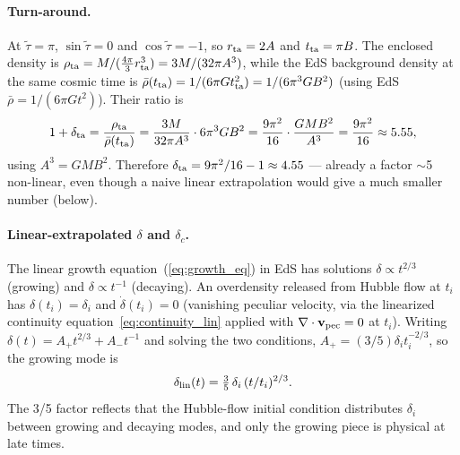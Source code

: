 \documentclass[12pt]{article}
\newcommand{\bv}{\mathbf{v}}
\begin{document}
\paragraph{Turn-around.}  At $\tilde\tau=\pi$, $\sin\tilde\tau=0$ and
$\cos\tilde\tau=-1$, so $r_{\rm ta}=2A$ and $t_{\rm ta}=\pi B$.
The enclosed density is
$\rho_{\rm ta} = M/(\tfrac{4\pi}{3}r_{\rm ta}^3) = 3M/(32\pi A^3)$,
while the EdS background density at the same cosmic time is
$\bar\rho(t_{\rm ta})=1/(6\pi G t_{\rm ta}^2)=1/(6\pi^3 G B^2)$
(using EdS $\bar\rho=1/(6\pi G t^2)$).  Their ratio is
%
\begin{equation}
  1+\delta_{\rm ta}
  = \frac{\rho_{\rm ta}}{\bar\rho(t_{\rm ta})}
  = \frac{3M}{32\pi A^3}\cdot 6\pi^3 G B^2
  = \frac{9\pi^2}{16}\cdot\frac{GMB^2}{A^3}
  = \frac{9\pi^2}{16} \approx 5.55,
\end{equation}
%
using $A^3 = GMB^2$.  Therefore $\delta_{\rm ta} = 9\pi^2/16 - 1
\approx 4.55$ --- already a factor $\sim$5 non-linear, even though a
naive linear extrapolation would give a much smaller number (below).

\paragraph{Linear-extrapolated $\delta$ and $\delta_c$.}  The linear
growth equation~(\ref{eq:growth_eq}) in EdS has solutions
$\delta \propto t^{2/3}$ (growing) and $\delta \propto t^{-1}$
(decaying).  An overdensity released from Hubble flow at $t_i$ has
$\delta(t_i)=\delta_i$ and $\dot\delta(t_i)=0$ (vanishing peculiar
velocity, via the linearized continuity equation~\ref{eq:continuity_lin}
applied with $\nabla\cdot\bv_{\rm pec}=0$ at $t_i$).  Writing
$\delta(t) = A_+ t^{2/3} + A_- t^{-1}$ and solving the two
conditions, $A_+ = (3/5)\delta_i t_i^{-2/3}$, so the growing mode is
%
\begin{equation}
  \delta_{\rm lin}(t) = \tfrac{3}{5}\,\delta_i\,(t/t_i)^{2/3}.
  \label{eq:delta_lin_time}
\end{equation}
%
The 3/5 factor reflects that the Hubble-flow initial condition
distributes $\delta_i$ between growing and decaying modes, and only
the growing piece is physical at late times.
\end{document}
